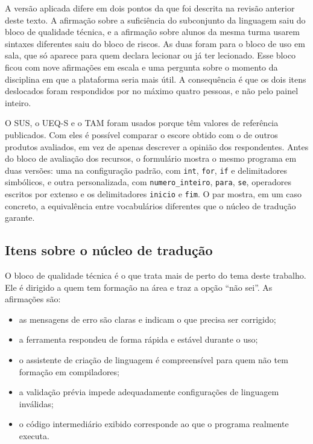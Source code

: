 A versão aplicada difere em dois pontos da que foi descrita na revisão anterior deste texto. A afirmação sobre a suficiência do subconjunto da linguagem saiu do bloco de qualidade técnica, e a afirmação sobre alunos da mesma turma usarem sintaxes diferentes saiu do bloco de riscos. As duas foram para o bloco de uso em sala, que só aparece para quem declara lecionar ou já ter lecionado. Esse bloco ficou com nove afirmações em escala e uma pergunta sobre o momento da disciplina em que a plataforma seria mais útil. A consequência é que os dois itens deslocados foram respondidos por no máximo quatro pessoas, e não pelo painel inteiro.

O SUS, o UEQ-S e o TAM foram usados porque têm valores de referência publicados. Com eles é possível comparar o escore obtido com o de outros produtos avaliados, em vez de apenas descrever a opinião dos respondentes. Antes do bloco de avaliação dos recursos, o formulário mostra o mesmo programa em duas versões: uma na configuração padrão, com \texttt{int}, \texttt{for}, \texttt{if} e delimitadores simbólicos, e outra personalizada, com \texttt{numero\_inteiro}, \texttt{para}, \texttt{se}, operadores escritos por extenso e os delimitadores \texttt{inicio} e \texttt{fim}. O par mostra, em um caso concreto, a equivalência entre vocabulários diferentes que o núcleo de tradução garante.

\subsection{Itens sobre o núcleo de tradução}

O bloco de qualidade técnica é o que trata mais de perto do tema deste trabalho. Ele é dirigido a quem tem formação na área e traz a opção ``não sei''. As afirmações são:

\begin{itemize}
    \item as mensagens de erro são claras e indicam o que precisa ser corrigido;
    \item a ferramenta respondeu de forma rápida e estável durante o uso;
    \item o assistente de criação de linguagem é compreensível para quem não tem formação em compiladores;
    \item a validação prévia impede adequadamente configurações de linguagem inválidas;
    \item o código intermediário exibido corresponde ao que o programa realmente executa.
\end{itemize}


